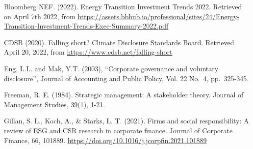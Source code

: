 \documentclass[
  12pt,
]{article}
\begin{document}
Bloomberg NEF. (2022). Energy Transition Investment Trends 2022.
Retrieved on April 7th 2022, from
\url{https://assets.bbhub.io/professional/sites/24/Energy-Transition-Investment-Trends-Exec-Summary-2022.pdf}

CDSB (2020). Falling short? Climate Disclosure Standards Board.
Retrieved April 20, 2022, from \url{https://www.cdsb.net/falling-short}

Eng, L.L. and Mak, Y.T. (2003), ``Corporate governance and voluntary
disclosure'', Journal of Accounting and Public Policy, Vol. 22 No.~4,
pp.~325-345.

Freeman, R. E. (1984). Strategic management: A stakeholder theory.
Journal of Management Studies, 39(1), 1-21.

Gillan, S. L., Koch, A., \& Starks, L. T. (2021). Firms and social
responsibility: A review of ESG and CSR research in corporate finance.
Journal of Corporate Finance, 66, 101889.
\url{https://doi.org/10.1016/j.jcorpfin.2021.101889}
\end{document}
